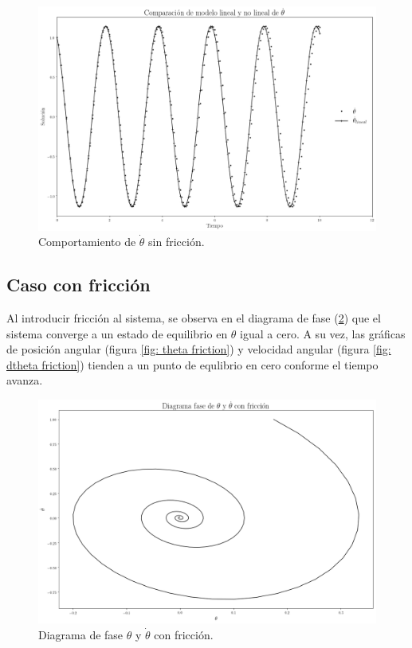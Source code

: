 \documentclass[12pt,letterpaper]{article}
\begin{document}
\begin{figure}[h]
 \centering
 \includegraphics[scale=0.2]{img/sp_plot_dtheta_dtheta_linear.png}
 \caption{Comportamiento de $\dot{\theta}$ sin fricción.}
 \label{fig: dtheta}
\end{figure}

\pagebreak

\subsection*{Caso con fricción}

Al introducir fricción al sistema, se observa en el diagrama 
de fase (\ref{fig: phase theta dtheta friction}) que el 
sistema converge a un estado de equilibrio en $\theta$ igual 
a cero. A su vez, las gráficas de posición angular (figura 
\ref{fig: theta friction}) y velocidad angular (figura 
\ref{fig: dtheta friction}) tienden a un punto de equlibrio 
en cero conforme el tiempo avanza.

\begin{figure}[h]
 \centering
 \includegraphics[scale=0.2]{img/sp_phase_diagram_theta_dtheta_friction.png}
 \caption{Diagrama de fase $\theta$ y $\dot{\theta}$ con fricción.}
 \label{fig: phase theta dtheta friction}
\end{figure}
\end{document}
